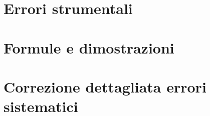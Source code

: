 \documentclass[12pt,a4paper]{article}
\begin{document}
\section{Errori strumentali}\label{sec:errori_strumentali}


\section{Formule e dimostrazioni}\label{sec:formule-e-dimostrazioni}

  


\section{Correzione dettagliata errori sistematici}\label{sec:correzione-dettagliata-errori-sistematici}

  
\end{document}
